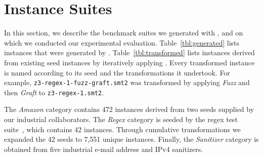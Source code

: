 \section{Instance Suites}
\label{sec:suites}

In this section, we describe the benchmark suites we generated
with \fuzzer{}, and on which we conducted our experimental
evaluation. Table~\ref{tbl:generated} lists instances that were
generated by \generator{}. Table~\ref{tbl:transformed} lists instances
derived from existing seed instances by iteratively applying \transformer{}.
Every transformed instance is named according to its
seed and the transformations it undertook. For example,
\texttt{z3-regex-1-fuzz-graft.smt2} was transformed by applying
\textit{Fuzz} and then \textit{Graft} to \texttt{z3-regex-1.smt2}.

The \textit{Amazon} category contains 472 instances derived from two seeds
supplied by our industrial collaborators. The \textit{Regex} category is
seeded by the \usOld{} regex test suite~\cite{z3str2-tests}, which contains
42 instances. Through cumulative transformations we expanded the
42 seeds to 7,551 unique instances. Finally, the \textit{Sanitizer} category
is obtained from five industrial e-mail address and IPv4 sanitizers.

